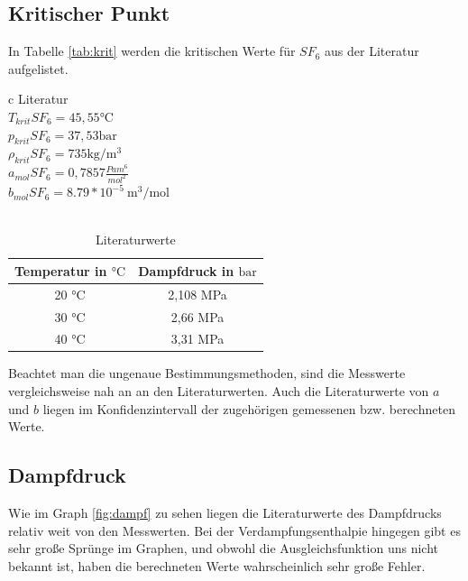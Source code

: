 \documentclass[11pt, a4paper]{article}
\begin{document}
    \subsection{Kritischer Punkt}
    In Tabelle \ref{tab:krit} werden die kritischen Werte für $SF_6$ aus der Literatur aufgelistet.
    \begin{table}[H]
        \centering
        \begin{tabular}{c}
            Literatur \\ \hline
            $T_{krit} SF_6 = 45,55 \si{\celsius}$ \cite{SH6} \\
            $p_{krit} SF_6 = 37,53 \si{\bar}$ \cite{SH6} \\
            $\rho_{krit} SF_6 = 735 \si{\kilogram \per \meter \cubed}$ \cite{SH6} \\
            $a_{mol} SF_6= 0,7857 \frac{Pa m^6}{mol^2}$ \cite{THEO}\\
            $b_{mol} SF_6= 8.79*10^{-5}~\si{\cubic\metre\per\mol}$\cite{THEO}\\
            \\
            \begin{tabular}{c c}
                Temperatur in $\si{\celsius}$ & Dampfdruck in $\si{\bar}$ \\ \hline
                20 \si{\celsius} & 2,108 \si{\mega\pascal} \\
                30 \si{\celsius} & 2,66 \si{\mega\pascal} \\
                40 \si{\celsius} & 3,31 \si{\mega\pascal} \\
            \end{tabular}
        \end{tabular}
        \caption{Literaturwerte}
        \label{tab:literaturwerte}
    \end{table}
    Beachtet man die ungenaue Bestimmungsmethoden, sind die Messwerte vergleichsweise nah an an den Literaturwerten. 
    Auch die Literaturwerte von $a$ und $b$ liegen im Konfidenzintervall der zugehörigen gemessenen bzw. berechneten Werte. 

    \subsection{Dampfdruck}
    Wie im Graph \ref{fig:dampf} zu sehen liegen die Literaturwerte des Dampfdrucks relativ weit von den Messwerten.
    Bei der Verdampfungsenthalpie hingegen gibt es sehr große Sprünge im Graphen, und obwohl die Ausgleichsfunktion
    uns nicht bekannt ist, haben die berechneten Werte wahrscheinlich sehr große Fehler. 
\end{document}
